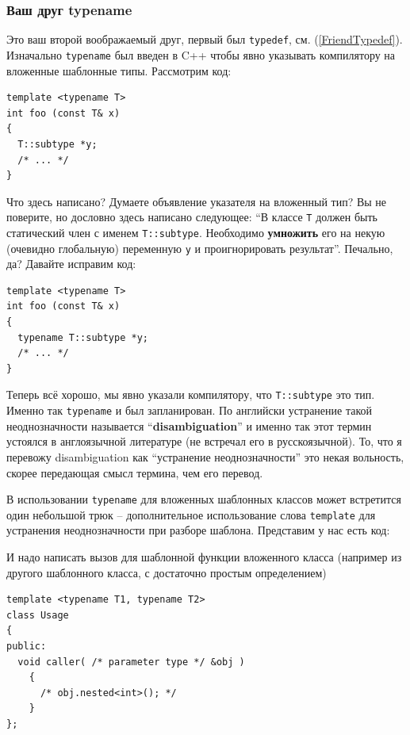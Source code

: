 \documentclass[a4paper,12pt,oneside]{article}
\begin{document}
\subsubsection{Ваш друг typename}\label{FriendTypename}

Это ваш второй воображаемый друг, первый был \lstinline!typedef!, см. (\ref{FriendTypedef}). Изначально \lstinline!typename! был введен в C++ чтобы явно указывать компилятору на вложенные шаблонные типы. Рассмотрим код:

\begin{lstlisting}
template <typename T>
int foo (const T& x)
{
  T::subtype *y;
  /* ... */
}
\end{lstlisting}

Что здесь написано? Думаете объявление указателя на вложенный тип? Вы не поверите, но дословно здесь написано 
следующее: ``В классе \lstinline!T! должен быть статический член с именем \lstinline!T::subtype!. Необходимо \textbf{умножить} его на некую (очевидно глобальную) переменную \lstinline!y! и проигнорировать результат''. Печально, да? Давайте исправим код:

\begin{lstlisting}
template <typename T>
int foo (const T& x)
{
  typename T::subtype *y;
  /* ... */
}
\end{lstlisting}

Теперь всё хорошо, мы явно указали компилятору, что \lstinline!T::subtype! это тип. Именно так \lstinline!typename! и был запланирован. По английски устранение такой неоднозначности называется ``\textbf{disambiguation}''  и именно так этот термин устоялся в англоязычной литературе (не встречал его в русскоязычной). То, что я перевожу disambiguation как ``устранение неоднозначности'' это некая вольность, скорее передающая смысл термина, чем его перевод.

В использовании \lstinline!typename! для вложенных шаблонных классов может встретится один небольшой трюк -- дополнительное использование слова \lstinline!template! для устранения неоднозначности при разборе шаблона. Представим у нас есть код:



И надо написать вызов для шаблонной функции вложенного класса (например из другого шаблонного класса, с достаточно простым определением)

\begin{lstlisting}
template <typename T1, typename T2>
class Usage
{
public:
  void caller( /* parameter type */ &obj )
    {
      /* obj.nested<int>(); */
    }
};
\end{lstlisting}
\end{document}
